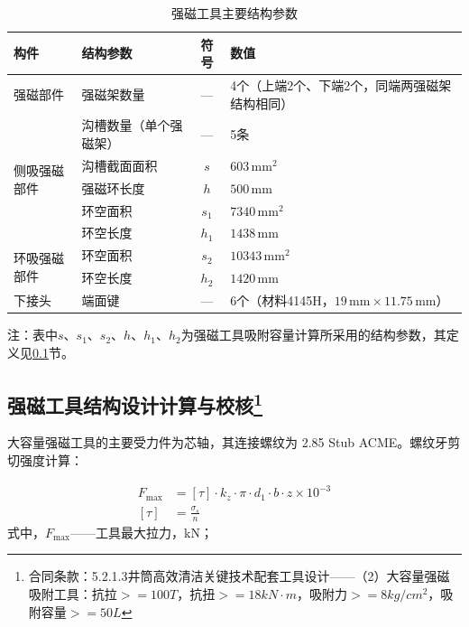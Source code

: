\begin{table}[htbp]
    \centering
    \caption{强磁工具主要结构参数}
    \label{tab:mag_tool_structure_params}
    \renewcommand{\arraystretch}{1.3} %
    \begin{tabularx}{.9\textwidth}{llcX}
        \toprule
        构件 & 结构参数 & 符号 & 数值 \\
        \midrule
        强磁部件 & 强磁架数量 & --- & 4个（上端2个、下端2个，同端两强磁架结构相同） \\
        \midrule
        \multirow{5}{*}{侧吸强磁部件} & 沟槽数量（单个强磁架） & --- & 5条 \\
         & 沟槽截面面积 & $s$ & $603\,\text{mm}^2$ \\
         & 强磁环长度 & $h$ & $500\,\text{mm}$ \\
         & 环空面积 & $s_1$ & $7340\,\text{mm}^2$ \\
         & 环空长度 & $h_1$ & $1438\,\text{mm}$ \\
        \midrule
        \multirow{2}{*}{环吸强磁部件} & 环空面积 & $s_2$ & $10343\,\text{mm}^2$ \\
         & 环空长度 & $h_2$ & $1420\,\text{mm}$ \\
        \midrule
        下接头 & 端面键 & --- & 6个（材料4145H，$19\,\text{mm}\times11.75\,\text{mm}$） \\
        \bottomrule
    \end{tabularx}
\end{table}

注：表中$s$、$s_1$、$s_2$、$h$、$h_1$、$h_2$为强磁工具吸附容量计算所采用的结构参数，其定义见\ref{sec:mag_tool_check}节。

\subsection[强磁工具结构设计计算与校核]{强磁工具结构设计计算与校核\protect\footnote{合同条款：5.2.1.3井筒高效清洁关键技术配套工具设计——（2）大容量强磁吸附工具：抗拉$>=100T$，抗扭$>=18kN\cdot m$，吸附力$>=8kg/cm^2$，吸附容量$>=50L$}}\label{sec:mag_tool_check}


大容量强磁工具的主要受力件为芯轴，其连接螺纹为 2.85 Stub ACME。螺纹牙剪切强度计算：

\begin{align}
    F_{\max} &= [\tau] \cdot k_z \cdot \pi \cdot d_1 \cdot b \cdot z \times 10^{-3} \\
    [\tau] &= \frac{\sigma_s}{n}
\end{align}
式中，$F_{\max}$——工具最大拉力，kN；

